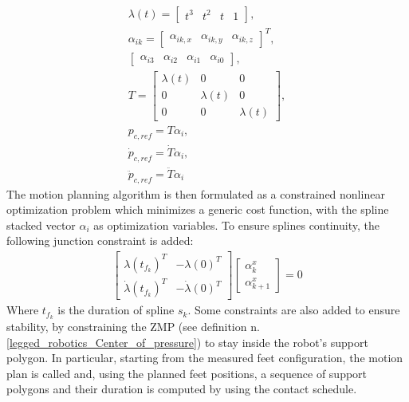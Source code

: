 \begin{gather}
    \lambda(t)=
    \begin{bmatrix}
        t^3 & t^2 & t & 1
    \end{bmatrix},\\
    \alpha_{ik}=
    \begin{bmatrix}
        \alpha_{ik,x} & \alpha_{ik,y} & \alpha_{ik,z}    
    \end{bmatrix}^{T},\\
    \begin{bmatrix}
        \alpha_{i3} & \alpha_{i2} & \alpha_{i1} & \alpha_{i0}
    \end{bmatrix},\\
    T=
    \begin{bmatrix}
        \lambda(t) & 0 & 0\\
        0 & \lambda(t) & 0\\
        0 & 0 & \lambda(t)
    \end{bmatrix}, \\
    p_{c,ref}=T\alpha_i,\\
    \dot{p}_{c,ref}=\dot{T}\alpha_i,\\
    \ddot{p}_{c,ref}=\ddot{T}\alpha_i
\end{gather}
The motion planning algorithm is then formulated as a constrained nonlinear optimization problem which minimizes a generic cost function, with the spline stacked vector $\alpha_i$ as optimization variables. To ensure splines continuity, the following junction constraint is added:
\begin{gather}
    \begin{bmatrix}
        \lambda(t_{f_k})^{T} & -\lambda(0)^{T}\\
        \dot{\lambda}(t_{f_k})^{T} & -\dot{\lambda}(0)^{T}
    \end{bmatrix}
    \begin{bmatrix}
        \alpha_{k}^{x}\\
        \alpha_{k+1}^{x}
    \end{bmatrix}=0
\end{gather}
Where $t_{f_k}$ is the duration of spline $s_k$. Some constraints are also added to ensure stability, by constraining the ZMP (see definition n.\ref{legged_robotics_Center_of_pressure}) to stay inside the robot's support polygon. In particular, starting from the measured feet configuration, the motion plan is called and, using the planned feet positions, a sequence of support polygons and their duration is computed by using the contact schedule. 
